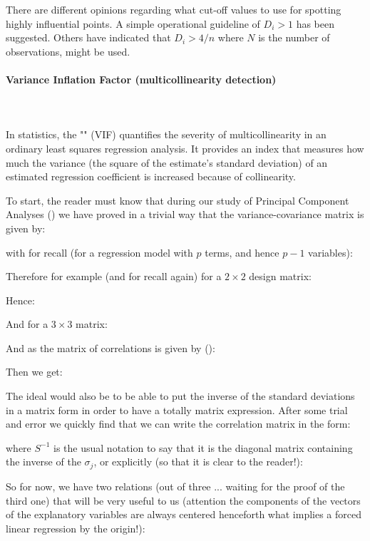 	There are different opinions regarding what cut-off values to use for spotting highly influential points. A simple operational guideline of $D_{i}>1$ has been suggested. Others have indicated that $D_i>4/n$ where $N$ is the number of observations, might be used.
	
	\paragraph{Variance Inflation Factor (multicollinearity detection)}\mbox{}\\\\
	In statistics, the "\label{variance inflation factor}" (VIF) quantifies the severity of multicollinearity in an ordinary least squares regression analysis. It provides an index that measures how much the variance (the square of the estimate's standard deviation) of an estimated regression coefficient is increased because of collinearity.

	To start, the reader must know that during our study of Principal Component Analyses () we have proved in a trivial way that the variance-covariance matrix is given by:
	
	with for recall (for a regression model with $p$ terms, and hence $p-1$ variables):
	
	Therefore for example (and for recall again) for a $2\times 2$ design matrix:
	
	Hence:
	
	And for a $3\times 3$ matrix:
	
	And as the matrix of correlations is given by ():
	
	Then we get:
	
	The ideal would also be to be able to put the inverse of the standard deviations in a matrix form in order to have a totally matrix expression. After some trial and error we quickly find that we can write the correlation matrix in the form:
	
	where $S^{-1}$ is the usual notation to say that it is the diagonal matrix containing the inverse of the $\sigma_j$, or explicitly (so that it is clear to the reader!):
	
	So for now, we have two relations (out of three ... waiting for the proof of the third one) that will be very useful to us (attention the components of the vectors of the explanatory variables are always centered henceforth what implies a forced linear regression by the origin!):
	

